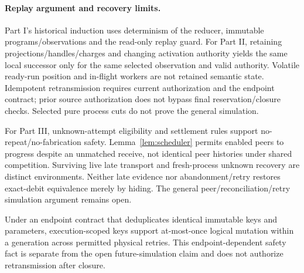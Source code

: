 \documentclass[11pt,a4paper]{article}
\theoremstyle{definition}
\theoremstyle{remark}
\begin{document}
\paragraph{Replay argument and recovery limits.} Part I's historical induction uses determinism of the reducer, immutable programs/observations and the read-only replay guard. For Part II, retaining projections/handles/charges and changing activation authority yields the same local successor only for the same selected observation and valid authority. Volatile ready-run position and in-flight workers are not retained semantic state. Idempotent retransmission requires current authorization and the endpoint contract; prior source authorization does not bypass final reservation/closure checks. Selected pure process cuts do not prove the general simulation.

For Part III, unknown-attempt eligibility and settlement rules support no-repeat/no-fabrication safety. Lemma~\ref{lem:scheduler} permits enabled peers to progress despite an unmatched receive, not identical peer histories under shared competition. Surviving live late transport and fresh-process unknown recovery are distinct environments. Neither late evidence nor abandonment/retry restores exact-debit equivalence merely by hiding. The general peer/reconciliation/retry simulation argument remains open.

Under an endpoint contract that deduplicates identical immutable keys and parameters, execution-scoped keys support at-most-once logical mutation within a generation across permitted physical retries. This endpoint-dependent safety fact is separate from the open future-simulation claim and does not authorize retransmission after closure.
\end{document}
